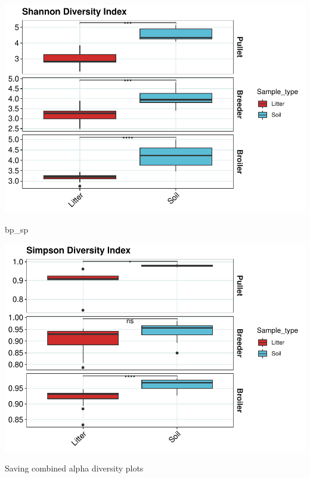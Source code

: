 \documentclass[
]{article}
\newenvironment{Shaded}{\begin{snugshade}}{\end{snugshade}}
\newcommand{\NormalTok}[1]{#1}
\begin{document}
\includegraphics{Final_Project_Pankaj_files/figure-latex/drawing alpha diversity box plots-2.pdf}

\begin{Shaded}
\begin{Highlighting}[]
\NormalTok{bp\_sp}
\end{Highlighting}
\end{Shaded}

\includegraphics{Final_Project_Pankaj_files/figure-latex/drawing alpha diversity box plots-3.pdf}

Saving combined alpha diversity plots
\end{document}
